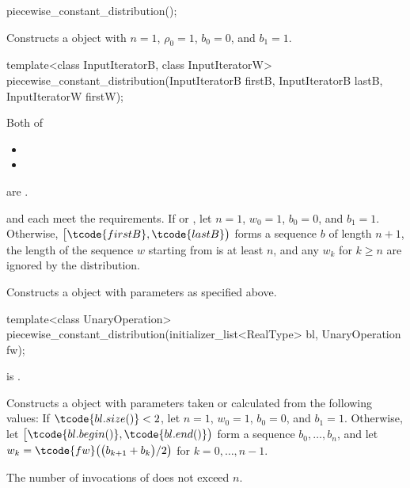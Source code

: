 %
\begin{itemdecl}
piecewise_constant_distribution();
\end{itemdecl}

\begin{itemdescr}
\pnum
\effects
Constructs a  object
 with $n = 1$,
 $\rho_0 = 1$,
 $b_0 = 0$,
 and $b_1 = 1$.
\end{itemdescr}


%
\begin{itemdecl}
template<class InputIteratorB, class InputIteratorW>
 piecewise_constant_distribution(InputIteratorB firstB, InputIteratorB lastB,
                                 InputIteratorW firstW);
\end{itemdecl}

\begin{itemdescr}
\pnum
\mandates
Both of
\begin{itemize}
\item{}
\item{}
\end{itemize}
are .

\pnum
\expects
   and 
   each meet the
   requirements.
 If 
 or ,
 let $n = 1$,
     $w_0 = 1$,
     $b_0 = 0$,
 and $b_1 = 1$.
 Otherwise,
 $\bigl[\tcode{firstB}, \tcode{lastB}\bigr)$
 forms a sequence $b$ of length $n+1$,
 the length of the sequence $w$ starting from 
 is at least $n$,
 and any $w_k$ for  $k \geq n$ are ignored by the distribution.

\pnum
\effects
Constructs a  object
 with parameters as specified above.
\end{itemdescr}


%
\begin{itemdecl}
template<class UnaryOperation>
 piecewise_constant_distribution(initializer_list<RealType> bl, UnaryOperation fw);
\end{itemdecl}

\begin{itemdescr}
\pnum
\mandates
{} is .

\pnum
\effects
Constructs a  object
 with parameters taken or calculated
 from the following values:
 If $\tcode{bl.size()} < 2$,
 let $n = 1$,
     $w_0 = 1$,
     $b_0 = 0$,
 and $b_1 = 1$.
 Otherwise,
 let $\bigl[\tcode{bl.begin()}, \tcode{bl.end()}\bigr)$
 form a sequence $b_0, \dotsc, b_n$,
 and
 let $w_k = \tcode{fw}\bigl(\bigl(b_{k+1} + b_k\bigr) / 2\bigr)$
 for $k = 0, \dotsc, n - 1$.

\pnum
\complexity
The number of invocations of  does not exceed $n$.
\end{itemdescr}


